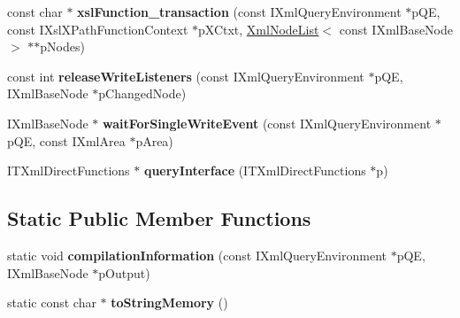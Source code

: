 \begin{DoxyCompactItemize}
\item 
\hypertarget{group__XSLModule-Functions_ga280b7fac71183e9ed14892316504558e}{const char $\ast$ {\bfseries xsl\-Function\-\_\-transaction} (const \-I\-Xml\-Query\-Environment $\ast$p\-Q\-E, const \-I\-Xsl\-X\-Path\-Function\-Context $\ast$p\-X\-Ctxt, \hyperlink{classgeneral__server_1_1XmlNodeList}{\-Xml\-Node\-List}$<$ const \-I\-Xml\-Base\-Node $>$ $\ast$$\ast$p\-Nodes)}\label{group__XSLModule-Functions_ga280b7fac71183e9ed14892316504558e}

\item 
\hypertarget{classgeneral__server_1_1Database_ad5ec2c0fc3f0e6cafd3052b48597c431}{const int {\bfseries release\-Write\-Listeners} (const \-I\-Xml\-Query\-Environment $\ast$p\-Q\-E, \-I\-Xml\-Base\-Node $\ast$p\-Changed\-Node)}\label{classgeneral__server_1_1Database_ad5ec2c0fc3f0e6cafd3052b48597c431}

\item 
\hypertarget{classgeneral__server_1_1Database_a99bda0cff485b498b5b3a890161616e8}{\-I\-Xml\-Base\-Node $\ast$ {\bfseries wait\-For\-Single\-Write\-Event} (const \-I\-Xml\-Query\-Environment $\ast$p\-Q\-E, const \-I\-Xml\-Area $\ast$p\-Area)}\label{classgeneral__server_1_1Database_a99bda0cff485b498b5b3a890161616e8}

\item 
\hypertarget{classgeneral__server_1_1Database_ae2b9fd39190c7e62c39484b4d053b7e6}{\-I\-T\-Xml\-Direct\-Functions $\ast$ {\bfseries query\-Interface} (\-I\-T\-Xml\-Direct\-Functions $\ast$p)}\label{classgeneral__server_1_1Database_ae2b9fd39190c7e62c39484b4d053b7e6}

\end{DoxyCompactItemize}
\subsection*{\-Static \-Public \-Member \-Functions}
\begin{DoxyCompactItemize}
\item 
\hypertarget{classgeneral__server_1_1Database_aec0492eb6683d2466015c9ff6fd8f0b0}{static void {\bfseries compilation\-Information} (const \-I\-Xml\-Query\-Environment $\ast$p\-Q\-E, \-I\-Xml\-Base\-Node $\ast$p\-Output)}\label{classgeneral__server_1_1Database_aec0492eb6683d2466015c9ff6fd8f0b0}

\item 
\hypertarget{classgeneral__server_1_1Database_a30dc44ba7ca684061f76bfc1f44f4d11}{static const char $\ast$ {\bfseries to\-String\-Memory} ()}\label{classgeneral__server_1_1Database_a30dc44ba7ca684061f76bfc1f44f4d11}

\end{DoxyCompactItemize}
